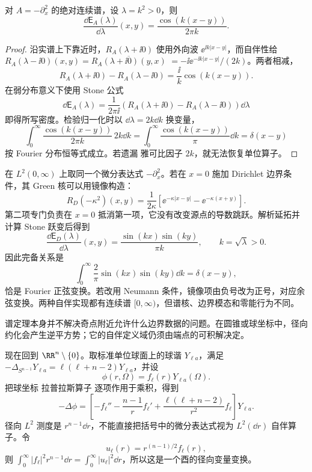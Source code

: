 \begin{theorem}[从预解跃变恢复自由谱密度]\label{thm:ghs-r6-stone-line}
对 $A=-\partial_x^2$ 的绝对连续谱，设 $\lambda=k^2>0$，则
\begin{equation}\label{eq:ghs-r6-free-spectral-density}
\frac{\dd\mathsf E_A(\lambda)}{\dd\lambda}(x,y)
=\frac{\cos(k(x-y))}{2\pi k}.
\end{equation}
\end{theorem}
\begin{proof}
沿实谱上下靠近时，$R_A(\lambda+\ii0)$ 使用外向波 $\ee^{\ii k|x-y|}$，而自伴性给
$R_A(\lambda-\ii0)(x,y)=\overline{R_A(\lambda+\ii0)(y,x)}$
$=-\ii\ee^{-\ii k|x-y|}/(2k)$。两者相减，
\[
R_A(\lambda+\ii0)-R_A(\lambda-\ii0)
=\frac{\ii}{k}\cos(k(x-y)).
\]
在弱分布意义下使用 Stone 公式
\[
\dd\mathsf E_A(\lambda)=\frac{1}{2\pi\ii}
(R_A(\lambda+\ii0)-R_A(\lambda-\ii0))\dd\lambda
\]
即得所写密度。检验归一化时以 $\dd\lambda=2k\dd k$ 换变量，
\[
\int_0^\infty\frac{\cos(k(x-y))}{2\pi k}\,2k\dd k
=\int_0^\infty\frac{\cos(k(x-y))}{\pi}\dd k=\delta(x-y)
\]
按 Fourier 分布恒等式成立。若遗漏 雅可比因子 $2k$，就无法恢复单位算子。
\end{proof}

在 $L^2(0,\infty)$ 上取同一个微分表达式 $-\partial_x^2$。若在 $x=0$ 施加 Dirichlet 边界条件，其 Green 核可以用镜像构造：
\begin{equation}\label{eq:ghs-r6-halfline-green}
R_D(-\kappa^2)(x,y)=\frac{1}{2\kappa}
\left[\ee^{-\kappa|x-y|}-\ee^{-\kappa(x+y)}\right].
\end{equation}
第二项专门负责在 $x=0$ 抵消第一项，它没有改变源点的导数跳跃。解析延拓并计算 Stone 跃变后得到
\begin{equation}\label{eq:ghs-r6-halfline-density}
\frac{\dd\mathsf E_D(\lambda)}{\dd\lambda}(x,y)
=\frac{\sin(kx)\sin(ky)}{\pi k},\qquad k=\sqrt\lambda>0.
\end{equation}
因此完备关系是
\[
\int_0^\infty\frac{2}{\pi}\sin(kx)\sin(ky)\dd k=\delta(x-y),
\]
恰是 Fourier 正弦变换。若改用 Neumann 条件，镜像项由负号改为正号，对应余弦变换。两种自伴实现都有连续谱 $[0,\infty)$，但谱核、边界模态和零能行为不同。

谱定理本身并不解决奇点附近允许什么边界数据的问题。在圆锥或球坐标中，径向约化会产生逆平方势；它的自伴定义域仍须由端点的可积解决定。

现在回到 $\RR^n\setminus\{0\}$。取标准单位球面上的球谐 $Y_{\ell a}$，满足 $-\Delta_{S^{n-1}}Y_{\ell a}=\ell(\ell+n-2)Y_{\ell a}$，并设
\[
\phi(r,\Omega)=f_\ell(r)Y_{\ell a}(\Omega).
\]
把球坐标 拉普拉斯算子 逐项作用于乘积，得到
\[
-\Delta\phi=\left[-f_\ell''-\frac{n-1}{r}f_\ell'
+\frac{\ell(\ell+n-2)}{r^2}f_\ell\right]Y_{\ell a}.
\]
径向 $L^2$ 测度是 $r^{n-1}\dd r$，不能直接把括号中的微分表达式视为 $L^2(\dd r)$ 自伴算子。令
\begin{equation}\label{eq:ghs-r6-radial-unitary}
u_\ell(r)=r^{(n-1)/2}f_\ell(r),
\end{equation}
则 $\int_0^\infty|f_\ell|^2r^{n-1}\dd r=\int_0^\infty|u_\ell|^2\dd r$，所以这是一个酉的径向变量变换。

